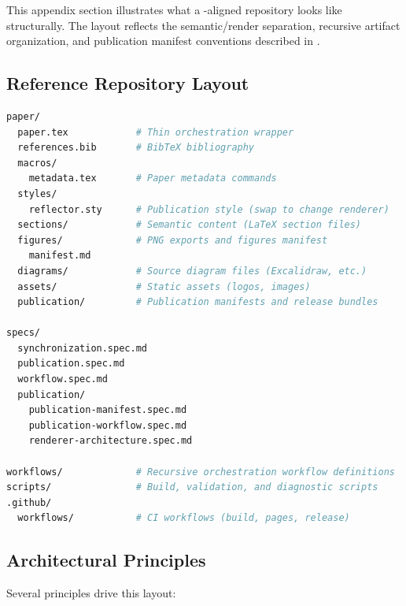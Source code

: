This appendix section illustrates what a -aligned repository looks like structurally. The layout reflects the semantic/render separation, recursive artifact organization, and publication manifest conventions described in .

\subsection{Reference Repository Layout}

\begin{lstlisting}[language=bash, caption={Reference repository architecture for a \reflector{}-aligned project.}, label={lst:repo-arch}]
paper/
  paper.tex            # Thin orchestration wrapper
  references.bib       # BibTeX bibliography
  macros/
    metadata.tex       # Paper metadata commands
  styles/
    reflector.sty      # Publication style (swap to change renderer)
  sections/            # Semantic content (LaTeX section files)
  figures/             # PNG exports and figures manifest
    manifest.md
  diagrams/            # Source diagram files (Excalidraw, etc.)
  assets/              # Static assets (logos, images)
  publication/         # Publication manifests and release bundles

specs/
  synchronization.spec.md
  publication.spec.md
  workflow.spec.md
  publication/
    publication-manifest.spec.md
    publication-workflow.spec.md
    renderer-architecture.spec.md

workflows/             # Recursive orchestration workflow definitions
scripts/               # Build, validation, and diagnostic scripts
.github/
  workflows/           # CI workflows (build, pages, release)
\end{lstlisting}

\subsection{Architectural Principles}

Several principles drive this layout:

